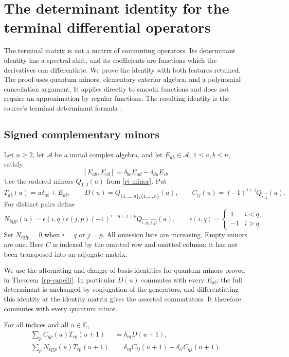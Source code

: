 \section{The determinant identity for the terminal differential operators}
\label{rq-section}

The terminal matrix is not a matrix of commuting operators.
Its determinant identity has a spectral shift, and its
coefficients are functions which the derivatives can differentiate.
We prove the identity with both features retained.
The proof uses quantum minors, elementary exterior algebra,
and a polynomial cancellation argument.  It applies directly
to smooth functions and does not require an approximation by
regular functions.  The resulting identity is the source's
terminal determinant formula \cite{alpo-uniform-source}.

\subsection{Signed complementary minors}

Let $n\geq2$, let $\mathcal A$ be a unital complex algebra, and let
$E_{ab}\in\mathcal A$, $1\leq a,b\leq n$, satisfy
\[
 [E_{ab},E_{cd}]=\delta_{bc}E_{ad}-\delta_{da}E_{cb}.
\]
Use the ordered minors $Q_{I,J}(u)$ from
\eqref{rt-minor}.  Put
\[
 T_{ab}(u)=u\delta_{ab}+E_{ab},\qquad
 D(u)=Q_{\{1,\ldots,n\},\{1,\ldots,n\}}(u),
 \qquad C_{ij}(u)=(-1)^{i+j}Q_{\widehat i,\widehat j}(u).
\]
For distinct pairs define
\[
 N_{iqjp}(u)=
 \epsilon(i,q)\epsilon(j,p)(-1)^{i+q+j+p}
 Q_{\widehat{i,q},\widehat{j,p}}(u),
 \qquad
 \epsilon(i,q)=
 \begin{cases}1&i<q,\\-1&i>q.\end{cases}
\]
Set $N_{iqjp}=0$ when $i=q$ or $j=p$.
All omission lists are increasing.  Empty minors are one.
Here $C$ is indexed by the omitted row and omitted column;
it has not been transposed into an adjugate matrix.

We use the alternating and change-of-basis identities
for quantum minors proved in Theorem~\ref{rp-capelli}.
In particular $D(u)$ commutes with every $E_{ab}$:
the full determinant is unchanged by conjugation of the
generators, and differentiating this identity at the
identity matrix gives the asserted commutators.
It therefore commutes with every quantum minor.

\begin{lemma}\label{rq-cofactor-expansions}
For all indices and all $u\in\mathbb C$,
\begin{align}
 \sum_p C_{qp}(u)T_{cp}(u+1)
       &=\delta_{cq}D(u+1),                 \label{rq-cofactor-one}\\
 \sum_p N_{iqjp}(u)T_{cp}(u+1)
       &=\delta_{cq}C_{ij}(u+1)
                   -\delta_{ci}C_{qj}(u+1). \label{rq-cofactor-two}
\end{align}
\end{lemma}


